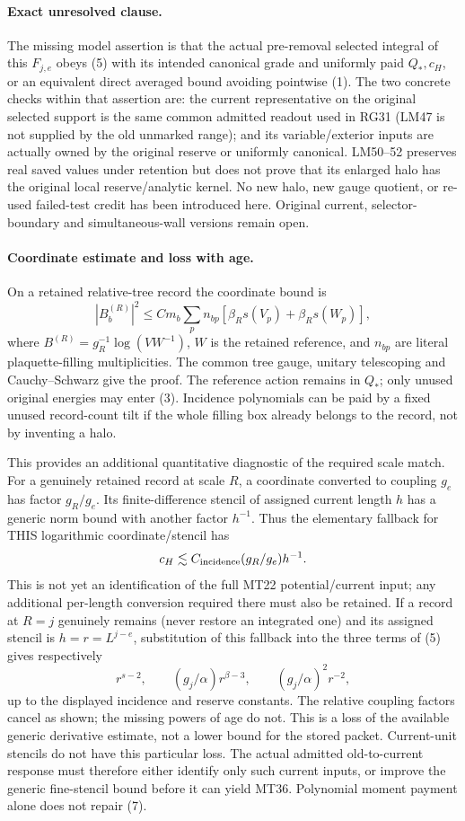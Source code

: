 \documentclass[11pt]{article}
\begin{document}
\paragraph{Exact unresolved clause.}
The missing model assertion is that the actual pre-removal selected integral of
this $F_{j,e}$ obeys (5) with its intended canonical grade and uniformly paid
$Q_*,c_H$, or an equivalent direct averaged bound avoiding pointwise (1).
The two concrete checks within that assertion are: the current representative
on the original selected support is the same common admitted readout used in
RG31 (LM47 is not supplied by the old unmarked range); and its variable/exterior
inputs are actually owned by the original reserve or uniformly canonical.
LM50--52 preserves real saved values under retention but does not prove that
its enlarged halo has the original local reserve/analytic kernel. No new halo,
new gauge quotient, or re-used failed-test credit has been introduced here.
Original current, selector-boundary and simultaneous-wall versions remain open.

\paragraph{Coordinate estimate and loss with age.}
On a retained relative-tree record the coordinate bound is
\[
 |B_b^{(R)}|^2\le C m_b\sum_p n_{bp}
       [\beta_R s(V_p)+\beta_R s(W_p)],
\]
where $B^{(R)}=g_R^{-1}\log(VW^{-1})$, $W$ is the retained reference,
and $n_{bp}$ are literal plaquette-filling multiplicities. The common tree gauge,
unitary telescoping and Cauchy--Schwarz give the proof. The
reference action remains in $Q_*$; only unused original energies may enter (3).
Incidence polynomials can be paid by a fixed unused record-count tilt if the
whole filling box already belongs to the record, not by inventing a halo.

This provides an additional quantitative diagnostic of the required scale match.
For a genuinely retained record at scale $R$, a coordinate converted to coupling
$g_e$ has factor $g_R/g_e$. Its finite-difference stencil of assigned current length
$h$ has a generic norm bound with another factor $h^{-1}$. Thus the elementary
fallback for THIS logarithmic coordinate/stencil has
\[
 c_H\lesssim C_{\rm incidence}(g_R/g_e)h^{-1}.
\]
This is not yet an identification of the full MT22 potential/current input; any
additional per-length conversion required there must also be retained. If a
record at $R=j$ genuinely remains (never restore an integrated one) and its
assigned stencil is $h=r=L^{j-e}$, substitution of this fallback into the three
terms of (5) gives respectively
\[
 r^{s-2},\qquad (g_j/\alpha)r^{\beta-3},\qquad
 (g_j/\alpha)^2r^{-2},                                 \tag{7}
\]
up to the displayed incidence and reserve constants. The relative coupling
factors cancel as shown; the missing powers of age do not. This is a loss of the
available generic derivative estimate, not a lower bound for the stored packet.
Current-unit stencils do not have this particular loss. The actual admitted
old-to-current response must therefore either identify only such current inputs,
or improve the generic fine-stencil bound before it can yield MT36. Polynomial
moment payment alone does not repair (7).
\end{document}
